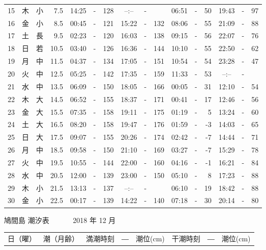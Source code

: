 \documentclass[12pt.a4j]{jsarticle}
\begin{document}
\begin{center}
\begin{table}[ht]
\begin{tabular}{|rc|cr|ccrccr|ccrccr|}
15 & 木 & 小 &  7.5 &  14:25 &-& 128  &  --:-- &-&     &   06:51 &-&  50  &   19:43 &-&  97  \\
16 & 金 & 小 &  8.5 &  00:45 &-& 121  &  15:22 &-& 132  &   08:06 &-&  55  &   21:09 &-&  88  \\
17 & 土 & 長 &  9.5 &  02:23 &-& 120  &  16:03 &-& 138  &   09:15 &-&  56  &   22:07 &-&  76  \\
18 & 日 & 若 & 10.5 &  03:40 &-& 126  &  16:36 &-& 144  &   10:10 &-&  55  &   22:50 &-&  62  \\
19 & 月 & 中 & 11.5 &  04:37 &-& 134  &  17:05 &-& 151  &   10:54 &-&  54  &   23:28 &-&  47  \\
20 & 火 & 中 & 12.5 &  05:25 &-& 142  &  17:35 &-& 159  &   11:33 &-&  53  &   --:-- &-&     \\
21 & 水 & 中 & 13.5 &  06:09 &-& 150  &  18:05 &-& 166  &   00:05 &-&  31  &   12:10 &-&  54  \\
22 & 木 & 大 & 14.5 &  06:52 &-& 155  &  18:37 &-& 171  &   00:41 &-&  17  &   12:46 &-&  56  \\
23 & 金 & 大 & 15.5 &  07:35 &-& 158  &  19:11 &-& 175  &   01:19 &-&   5  &   13:24 &-&  60  \\
24 & 土 & 大 & 16.5 &  08:20 &-& 158  &  19:47 &-& 176  &   01:59 &-&  -3  &   14:03 &-&  65  \\
25 & 日 & 大 & 17.5 &  09:07 &-& 155  &  20:26 &-& 174  &   02:42 &-&  -7  &   14:44 &-&  71  \\
26 & 月 & 中 & 18.5 &  09:58 &-& 150  &  21:10 &-& 169  &   03:27 &-&  -7  &   15:29 &-&  78  \\
27 & 火 & 中 & 19.5 &  10:55 &-& 144  &  22:00 &-& 160  &   04:16 &-&  -1  &   16:21 &-&  84  \\
28 & 水 & 中 & 20.5 &  12:00 &-& 139  &  23:00 &-& 150  &   05:10 &-&   8  &   17:23 &-&  88  \\
29 & 木 & 小 & 21.5 &  13:13 &-& 137  &  --:-- &-&     &   06:10 &-&  19  &   18:42 &-&  88  \\
30 & 金 & 小 & 22.5 &  00:17 &-& 139  &  14:22 &-& 140  &   07:18 &-&  30  &   20:14 &-&  80  \\
   \hline
   \end{tabular}
\end{table}
\newpage
 {\LARGE 鳩間島  潮汐表　　　}
 {\large 2018 年 12 月}\\
 \begin{table}[ht]
    \begin{tabular}{|rc|cr|ccrccr|ccrccr|}
    \hline
    \multicolumn{2}{|c|}{日（曜）} & \multicolumn{2}{c|}{潮（月齢）} & \multicolumn{6}{c|}{満潮時刻　―　潮位(cm)} & \multicolumn{6}{c|}{干潮時刻　―　潮位(cm)} \\

\end{tabular}
\end{table}
\end{center}
\end{document}

